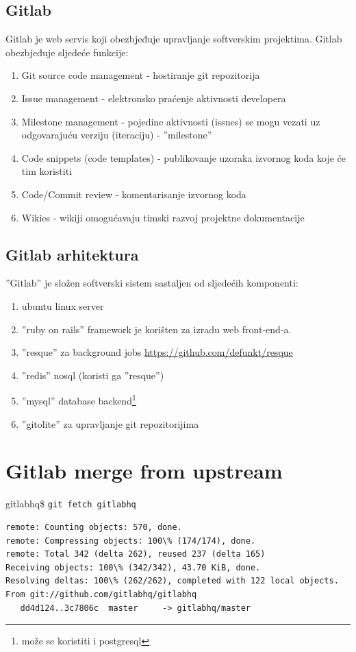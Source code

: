 \documentclass[times, utf8, seminar]{fit}
\begin{document}
\section{Gitlab}
Gitlab je web servis koji obezbjeđuje upravljanje softverskim projektima. Gitlab obezbjeđuje sljedeće funkcije:
\begin{enumerate}
  \item Git source code management - hostiranje git repozitorija
  \item Issue management - elektronsko praćenje aktivnosti developera
  \item Milestone management - pojedine aktivnosti (issues) se mogu vezati uz odgovarajuću verziju (iteraciju) - ''milestone''
  \item Code snippets (code templates) - publikovanje uzoraka izvornog koda koje će tim koristiti
  \item Code/Commit review - komentarisanje izvornog koda
  \item Wikies - wikiji omogućavaju timski razvoj projektne dokumentacije
\end{enumerate}

\section{Gitlab arhitektura}
''Gitlab'' je složen softverski sistem sastaljen od sljedećih komponenti:
\begin{enumerate}
  \item ubuntu linux server
  \item ''ruby on rails'' framework je korišten za izradu web front-end-a.
  \item ''resque'' za background jobs \url{https://github.com/defunkt/resque}
  \item ''redis'' nosql (koristi ga ''resque'')
  \item ''mysql'' database backend\footnote{može se koristiti i postgresql}
  \item ''gitolite'' za upravljanje git repozitorijima
\end{enumerate}


\chapter{Gitlab merge from upstream}

\setlength{\parindent 0cm}
gitlabhq\$ \verb+git fetch gitlabhq+
\begin{lstlisting}
remote: Counting objects: 570, done.
remote: Compressing objects: 100\% (174/174), done.
remote: Total 342 (delta 262), reused 237 (delta 165)
Receiving objects: 100\% (342/342), 43.70 KiB, done.
Resolving deltas: 100\% (262/262), completed with 122 local objects.
From git://github.com/gitlabhq/gitlabhq
   dd4d124..3c7806c  master     -> gitlabhq/master
\end{lstlisting}
\end{document}
